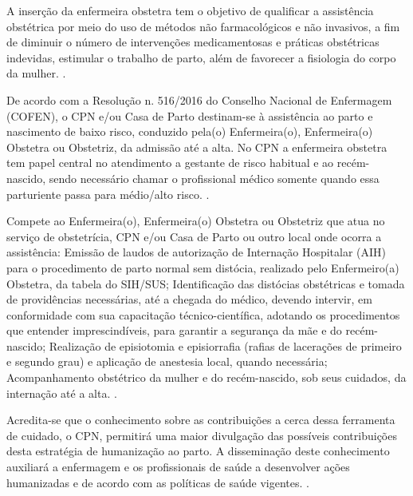 A inserção da enfermeira obstetra tem o objetivo de qualificar a assistência obstétrica por meio do uso de métodos não farmacológicos e não invasivos, a fim de diminuir o número de intervenções medicamentosas e práticas obstétricas indevidas, estimular o trabalho de parto, além de favorecer a fisiologia do corpo da mulher. 
\cite[p.21]{maia2010humanizaccao,vico2017avaliaccao}.

De acordo com a Resolução n. 516/2016 do Conselho Nacional de Enfermagem (\acrshort{COFEN}), o CPN e/ou Casa de Parto destinam-se à assistência ao parto e nascimento de baixo risco, conduzido pela(o) Enfermeira(o), Enfermeira(o) Obstetra ou Obstetriz, da admissão até a alta. No CPN a enfermeira obstetra tem papel central no atendimento a gestante de risco habitual e ao recém-nascido, sendo necessário chamar o profissional médico somente quando essa parturiente passa para médio/alto risco. \cite{deresoluccao}.

Compete ao Enfermeira(o), Enfermeira(o) Obstetra ou Obstetriz que atua no serviço de obstetrícia, CPN e/ou Casa de Parto ou outro local onde ocorra a assistência: Emissão de laudos de autorização de Internação Hospitalar (\acrshort{AIH}) para o procedimento de parto normal sem distócia, realizado pelo Enfermeiro(a) Obstetra, da tabela do \acrshort{SIH/SUS}; Identificação das distócias obstétricas e tomada de providências necessárias, até a chegada do médico, devendo intervir, em conformidade com sua capacitação técnico-científica, adotando os procedimentos que entender imprescindíveis, para garantir a segurança da mãe e do recém-nascido; Realização de episiotomia e episiorrafia (rafias de lacerações de primeiro e segundo grau) e aplicação de anestesia local, quando necessária; Acompanhamento obstétrico da mulher e do recém-nascido, sob seus cuidados, da internação até a alta. \cite{deresoluccao}.

Acredita-se que o conhecimento sobre as contribuições a cerca dessa ferramenta de cuidado, o CPN, permitirá uma maior divulgação das possíveis contribuições desta estratégia de humanização ao parto. A disseminação deste conhecimento auxiliará a enfermagem e os profissionais de saúde a desenvolver ações humanizadas e de acordo com as políticas de saúde vigentes. \cite{garcia2017centro}.